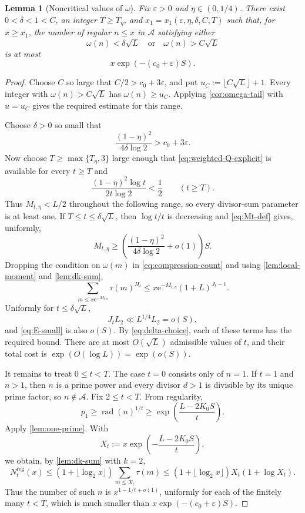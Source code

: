 \documentclass[11pt]{amsart}
\newtheorem{lemma}[lemma]{Lemma}
\theoremstyle{definition}
\theoremstyle{remark}
\numberwithin{equation}{section}
\newcommand{\rad}{\operatorname{rad}}
\newcommand{\e}{\mathrm e}
\newcommand{\Acal}{\mathcal A}
\newcommand{\eps}{\varepsilon}
\begin{document}
\begin{lemma}[Noncritical values of $\omega$]\label{lem:noncritical}
Fix $\eps>0$ and $\eta\in(0,1/4)$.  There exist $0<\delta<1<C$, an integer $T\ge T_\eta$, and $x_1=x_1(\eps,\eta,\delta,C,T)$ such that, for $x\ge x_1$, the number of regular $n\le x$ in $\Acal$ satisfying either
\[
 \omega(n)<\delta\sqrt L
 \quad\text{or}\quad
 \omega(n)>C\sqrt L
\]
is at most
\[
 x\exp(-(c_0+\eps)S).
\]
\end{lemma}

\begin{proof}
Choose $C$ so large that $C/2>c_0+3\eps$, and put
$u_C:=\lfloor C\sqrt L\rfloor+1$.  Every integer with
$\omega(n)>C\sqrt L$ has $\omega(n)\ge u_C$.  Applying
\cref{cor:omega-tail} with $u=u_C$ gives the required estimate for this
range.

Choose $\delta>0$ so small that
\begin{equation}\label{eq:delta-choice}
 \frac{(1-\eta)^2}{4\delta\log 2}>c_0+3\eps.
\end{equation}
Now choose $T\ge\max\{T_\eta,3\}$ large enough that \eqref{eq:weighted-Q-explicit} is available for every $t\ge T$ and
\[
 \frac{(1-\eta)^2\log t}{2t\log 2}<\frac12
 \qquad(t\ge T).
\]
Thus $M_{t,\eta}<L/2$ throughout the following range, so every divisor-sum parameter is at least one.  If $T\le t\le\delta\sqrt L$, then $\log t/t$ is decreasing and \eqref{eq:Mt-def} gives, uniformly,
\[
 M_{t,\eta}
 \ge\left(\frac{(1-\eta)^2}{4\delta\log 2}+o(1)\right)S.
\]
Dropping the condition on $\omega(m)$ in \eqref{eq:compression-count} and using \cref{lem:local-moment} and \cref{lem:dk-sum},
\[
 \sum_{m\le x\e^{-M_{t,\eta}}}\tau(m)^{H_t}
 \le x\e^{-M_{t,\eta}}(1+L)^{J_t-1}.
\]
Uniformly for $t\le\delta\sqrt L$,
\[
 J_t L_2\ll L^{1/4}L_2=o(S),
\]
and \eqref{eq:E-small} is also $o(S)$.  By \eqref{eq:delta-choice}, each of these terms has the required bound.
There are at most $O(\sqrt L)$ admissible values of $t$, and their total
cost is $\exp(O(\log L))=\exp(o(S))$.

It remains to treat $0\le t<T$.  The case $t=0$ consists only of $n=1$.  If $t=1$ and $n>1$, then $n$ is a prime power and every divisor $d>1$ is divisible by its unique prime factor, so $n\notin\Acal$.  Fix $2\le t<T$.  From regularity,
\[
 p_1\ge\rad(n)^{1/t}
 \ge\exp\!\left(\frac{L-2K_0S}{t}\right).
\]
Apply \cref{lem:one-prime}.  With
\[
 X_t:=x\exp\!\left(-\frac{L-2K_0S}{t}\right),
\]
we obtain, by \cref{lem:dk-sum} with $k=2$,
\[
 N_t^{\mathrm{reg}}(x)
 \le (1+\lfloor\log_2x\rfloor)
 \sum_{m\le X_t}\tau(m)
 \le (1+\lfloor\log_2x\rfloor)X_t(1+\log X_t).
\]
Thus the number of such $n$ is $x^{1-1/t+o(1)}$, uniformly for each of the finitely many $t<T$, which is much smaller than $x\exp(-(c_0+\eps)S)$.
\end{proof}
\end{document}
